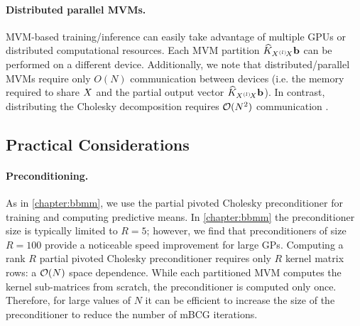 \paragraph{Distributed parallel MVMs.}
MVM-based training/inference can easily take advantage of multiple GPUs or distributed computational resources.
Each MVM partition $\widehat {K}_{X^{(l)}\!X} \mathbf{b}$ can be performed on a different device.
Additionally, we note that distributed/parallel MVMs require only $O(N)$ communication between devices (i.e. the memory required to share $X$ and the partial output vector $\widehat {K}_{X^{(l)}\!X} \mathbf{b}$).
In contrast, distributing the Cholesky decomposition requires $\bigo{N^2}$ communication \citep{nguyen2019exact}.






\subsection{Practical Considerations}



\paragraph{Preconditioning.}
As in \cref{chapter:bbmm}, we use the partial pivoted Cholesky preconditioner for training and computing predictive means.
In \cref{chapter:bbmm} the preconditioner size is typically limited to $R=5$; however, we find that preconditioners of size $R=100$ provide a noticeable speed improvement for large GPs.
Computing a rank $R$ partial pivoted Cholesky preconditioner requires only $R$ kernel matrix rows: a $\bigo{N}$ space dependence.
While each partitioned MVM computes the kernel sub-matrices from scratch, the preconditioner is computed only once.
Therefore, for large values of $N$ it can be efficient to increase the size of the preconditioner to reduce the number of mBCG iterations.


